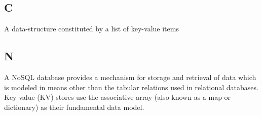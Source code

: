 \documentclass{scalatekids-article}
\begin{document}
\subsection{C}
   A data-structure constituted by a list of key-value items\label{coll} \\
\subsection{N}
   A NoSQL database provides a mechanism for storage and retrieval
  of data which is modeled in means other than the tabular relations used in
  relational databases. Key-value (KV) stores use the associative array (also known
  as a map or dictionary) as their fundamental data model.\label{nosql}
\end{document}
